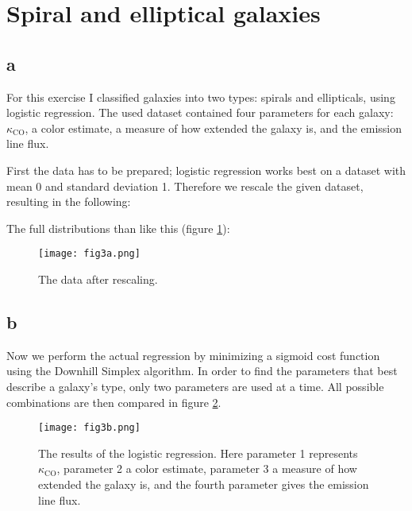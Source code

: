 \section{Spiral and elliptical galaxies}


\subsection*{a}
For this exercise I classified galaxies into two types: spirals and ellipticals, using logistic regression.
The used dataset contained four parameters for each galaxy: $\kappa_{\text{CO}}$, a color estimate, a measure of how extended the galaxy is, and the emission line flux.

First the data has to be prepared; logistic regression works best on a dataset with mean 0 and standard deviation 1.
Therefore we rescale the given dataset, resulting in the following:


The full distributions than like this (figure \ref{fig:rescaled_data}):
\begin{figure}
    \centering
    \texttt{[image: fig3a.png]}
    \caption{The data after rescaling.}
    \label{fig:rescaled_data}
\end{figure}





\subsection*{b}
Now we perform the actual regression by minimizing a sigmoid cost function using the Downhill Simplex algorithm.
In order to find the parameters that best describe a galaxy's type, only two parameters are used at a time.
All possible combinations are then compared in figure \ref{fig:logistic_regression}.

\begin{figure}
    \centering
    \texttt{[image: fig3b.png]}
    \caption{The results of the logistic regression. Here parameter 1 represents $\kappa_{\text{CO}}$, parameter 2 a color estimate, parameter 3 a measure of how extended the galaxy is, and the fourth parameter gives the emission line flux.}
    \label{fig:logistic_regression}
\end{figure}

